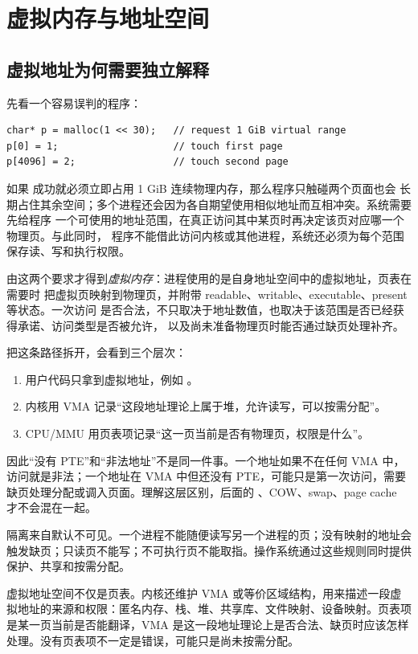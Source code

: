\chapter{虚拟内存与地址空间}

\section{虚拟地址为何需要独立解释}

先看一个容易误判的程序：

\begin{lstlisting}
char* p = malloc(1 << 30);   // request 1 GiB virtual range
p[0] = 1;                    // touch first page
p[4096] = 2;                 // touch second page
\end{lstlisting}

如果  成功就必须立即占用 1 GiB 连续物理内存，那么程序只触碰两个页面也会
长期占住其余空间；多个进程还会因为各自期望使用相似地址而互相冲突。系统需要先给程序
一个可使用的地址范围，在真正访问其中某页时再决定该页对应哪一个物理页。与此同时，
程序不能借此访问内核或其他进程，系统还必须为每个范围保存读、写和执行权限。

由这两个要求才得到\emph{虚拟内存}：进程使用的是自身地址空间中的虚拟地址，页表在需要时
把虚拟页映射到物理页，并附带 readable、writable、executable、present 等状态。一次访问
是否合法，不只取决于地址数值，也取决于该范围是否已经获得承诺、访问类型是否被允许，
以及尚未准备物理页时能否通过缺页处理补齐。

把这条路径拆开，会看到三个层次：

\begin{enumerate}
\tightlist
\item 用户代码只拿到虚拟地址，例如 。
\item 内核用 VMA 记录“这段地址理论上属于堆，允许读写，可以按需分配”。
\item CPU/MMU 用页表项记录“这一页当前是否有物理页，权限是什么”。
\end{enumerate}

因此“没有 PTE”和“非法地址”不是同一件事。一个地址如果不在任何 VMA 中，访问就是非法；一个地址在 VMA 中但还没有 PTE，可能只是第一次访问，需要缺页处理分配或调入页面。理解这层区别，后面的 、COW、swap、page cache 才不会混在一起。

隔离来自默认不可见。一个进程不能随便读写另一个进程的页；没有映射的地址会触发缺页；只读页不能写；不可执行页不能取指。操作系统通过这些规则同时提供保护、共享和按需分配。

虚拟地址空间不仅是页表。内核还维护 VMA 或等价区域结构，用来描述一段虚拟地址的来源和权限：匿名内存、栈、堆、共享库、文件映射、设备映射。页表项是某一页当前是否能翻译，VMA 是这一段地址理论上是否合法、缺页时应该怎样处理。没有页表项不一定是错误，可能只是尚未按需分配。

